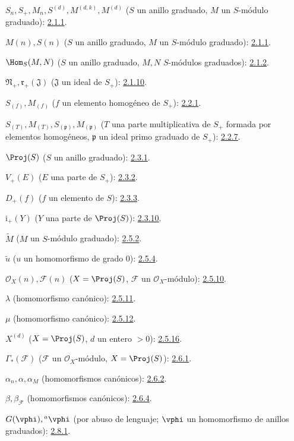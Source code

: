 \documentclass[oneside,10pt]{amsart}
\begin{document}
$S_n,S_+,M_n,S^{(d)},M^{(d,k)},M^{(d)}$
($S$ un anillo graduado, $M$ un $S$-módulo graduado): \hyperref[II.2.1.1-fr]{2.1.1}.

$M(n),S(n)$ ($S$ un anillo graduado, $M$ un $S$-módulo graduado): \hyperref[II.2.1.1-fr]{2.1.1}.

$\Hom_S(M,N)$ ($S$ un anillo graduado, $M,N$ $S$-módulos graduados): \hyperref[II.2.1.2-fr]{2.1.2}.

$\mathfrak N_+,\mathfrak r_+(\mathfrak J)$
($\mathfrak J$ un ideal de $S_+$): \hyperref[II.2.1.10-fr]{2.1.10}.

$S_{(f)},M_{(f)}$ ($f$ un elemento homogéneo de $S_+$): \hyperref[II.2.2.1-fr]{2.2.1}.

$S_{(T)},M_{(T)},S_{(\mathfrak p)},M_{(\mathfrak p)}$
($T$ una parte multiplicativa de $S_+$ formada por elementos homogéneos,
$\mathfrak p$ un ideal primo graduado de $S_+$): \hyperref[II.2.2.7-fr]{2.2.7}.

$\Proj(S)$ ($S$ un anillo graduado): \hyperref[II.2.3.1-fr]{2.3.1}.

$V_+(E)$ ($E$ una parte de $S_+$): \hyperref[II.2.3.2-fr]{2.3.2}.

$D_+(f)$ ($f$ un elemento de $S$): \hyperref[II.2.3.3-fr]{2.3.3}.

$\mathrm{i}_+(Y)$ ($Y$ una parte de $\Proj(S)$): \hyperref[II.2.3.10-fr]{2.3.10}.

$\widetilde M$ ($M$ un $S$-módulo graduado): \hyperref[II.2.5.2-fr]{2.5.2}.

$\widetilde u$ ($u$ un homomorfismo de grado $0$): \hyperref[II.2.5.4-fr]{2.5.4}.

$\mathcal{O}_X(n),\mathcal{F}(n)$
($X=\Proj(S)$, $\mathcal{F}$ un $\mathcal{O}_X$-módulo): \hyperref[II.2.5.10-fr]{2.5.10}.

$\lambda$ (homomorfismo canónico): \hyperref[II.2.5.11-fr]{2.5.11}.

$\mu$ (homomorfismo canónico): \hyperref[II.2.5.12-fr]{2.5.12}.

$X^{(d)}$ ($X=\Proj(S)$, $d$ un entero $>0$): \hyperref[II.2.5.16-fr]{2.5.16}.

$\Gamma_*(\mathcal{F})$ ($\mathcal{F}$ un $\mathcal{O}_X$-módulo,
$X=\Proj(S)$): \hyperref[II.2.6.1-fr]{2.6.1}.

$\alpha_n,\alpha,\alpha_M$ (homomorfismos canónicos): \hyperref[II.2.6.2-fr]{2.6.2}.

$\beta,\beta_{\mathcal{F}}$ (homomorfismos canónicos): \hyperref[II.2.6.4-fr]{2.6.4}.

$G(\vphi),{}^a\vphi$ (por abuso de lenguaje;
$\vphi$ un homomorfismo de anillos graduados): \hyperref[II.2.8.1-fr]{2.8.1}.
\end{document}
